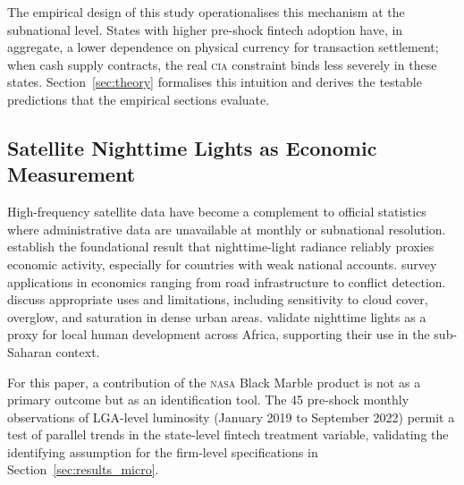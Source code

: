 The empirical design of this study operationalises this mechanism at the subnational level.
States with higher pre-shock fintech adoption have, in aggregate, a lower
dependence on physical currency for transaction settlement; when cash supply
contracts, the real \textsc{cia} constraint binds less severely in these
states. Section~\ref{sec:theory} formalises this intuition and derives the
testable predictions that the empirical sections evaluate.

\subsection{Satellite Nighttime Lights as Economic Measurement}

High-frequency satellite data have become a complement to official
statistics where administrative data are unavailable at monthly or subnational
resolution. \citet{henderson2012measuring} establish the foundational result
that nighttime-light radiance reliably proxies economic activity, especially
for countries with weak national accounts. \citet{donaldson2016view} survey
applications in economics ranging from road infrastructure to conflict
detection. \citet{gibson2020night} discuss appropriate uses and limitations,
including sensitivity to cloud cover, overglow, and saturation in dense urban
areas. \citet{bruederle2019nighttime} validate nighttime lights as a proxy for
local human development across Africa, supporting their use in the
sub-Saharan context.

For this paper, a contribution of the \textsc{nasa} \VIIRS{} Black Marble
product is not as a primary outcome but as an identification tool. The 45
pre-shock monthly observations of LGA-level luminosity (January 2019 to
September 2022) permit a test of parallel trends in the state-level
fintech treatment variable, validating the identifying assumption for
the firm-level specifications in Section~\ref{sec:results_micro}.
